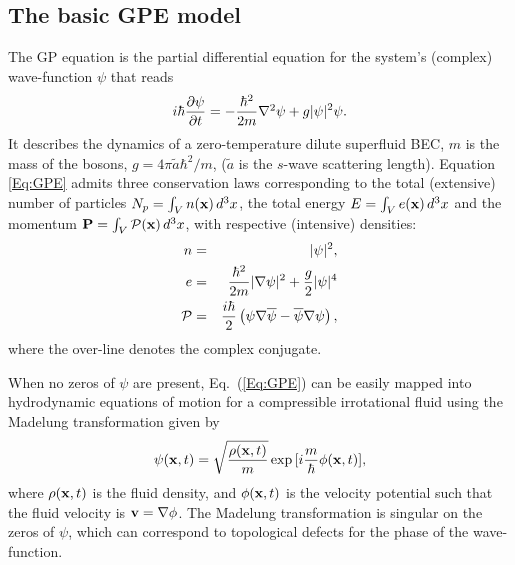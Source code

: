 \documentclass[sn-mathphys]{sn-jnl}%
\newcommand\bet{{g}}
\newcommand\alps{{\frac{\hbar^2}{2m}}}
\newcommand\dertt[1]{ \frac{\partial{ #1}}{\partial t} }
\newcommand\gd{\mbox{${\bf \nabla}^{2}$}}
\newcommand\psib{\overline{\psi}}
\begin{document}
\subsection{The basic GPE model}\label{sec:basic}
The GP equation \cite{Gross61,Pitaevskii61} is the partial differential equation for the system's (complex) wave-function $\psi$ that reads
\begin{equation} 
    i\hbar\dertt{\psi}  =- \alps \gd \psi + \bet\lvert \psi\rvert ^2\psi .
    \label{Eq:GPE}
\end{equation}
It describes the dynamics of a zero-temperature dilute
superfluid BEC, $m$ is
the mass of the bosons, $g=4 \pi  \tilde{a} \hbar^2/m$,
($\tilde{a}$ is the $s$-wave scattering length). 
Equation  \eqref{Eq:GPE} admits three conservation laws corresponding to
the total (extensive) number of particles $N_p=\int_V n({\bf x}) \,d^3x$, the total energy $E=\int_V e({\bf x}) \,d^3x$ and
the momentum ${\bf P}=\int_V {\cal P}({\bf x}) \,d^3x$, with respective (intensive) densities:
\begin{eqnarray}
n&=& \lvert \psi\rvert ^2  ,\label{Eq:defN}\\
  e&= & \alps \lvert \nabla \psi \rvert ^2
    +\frac{g}{2}\lvert \psi\rvert ^4  \label{Eq:defH}\\
  {\bf \cal P}&=& \frac{i\hbar}{2}\left(
    \psi {\bf \nabla}\psib - \psib {\bf
    \nabla}\psi\right)\label{Eq:defP},
\end{eqnarray}
where the over-line denotes the complex conjugate.

When no zeros of $\psi$ are present, Eq.~(\ref{Eq:GPE}) can be easily mapped into hydrodynamic
equations of motion for a compressible irrotational fluid using the
Madelung transformation given by 
\begin{equation}
    \psi({\bf x},t)=\sqrt{\frac{\rho({\bf x},t)}{m}}\exp{[i
    \frac{m}{\hbar}\phi({\bf x},t)]},\label{Eq:defMadelung}
\end{equation}
where $\rho({\bf x},t)$ is the fluid density, and $\phi({\bf x},t)$ is
the velocity potential such that the fluid velocity is 
${\bf v}={\bf \nabla} \phi$. The Madelung transformation is singular on
the zeros of $\psi$, which can correspond to topological defects for the phase of the wave-function. 
\end{document}

